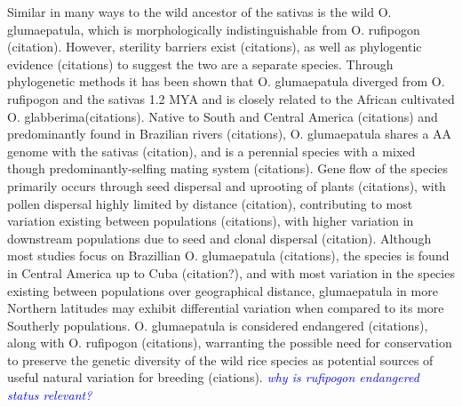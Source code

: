 \documentclass[11pt]{article} %
\newcommand{\jri}[1]{\textcolor{blue}{ \emph{\scriptsize  #1}} } %
\begin{document}
\begin{linenumbers}
Similar in many ways to the wild ancestor of the sativas is the wild O. glumaepatula, which is morphologically indistinguishable from O. rufipogon (citation). However, sterility barriers exist (citations), as well as phylogentic evidence (citations) to suggest the two are a separate species.  Through phylogenetic methods it has been shown that O. glumaepatula diverged from O. rufipogon and the sativas 1.2 MYA and is closely related to the African cultivated O. glabberima(citations). Native to South and Central America (citations) and predominantly found in Brazilian rivers (citations),  O. glumaepatula shares a AA genome with the sativas (citation), and is a perennial species with a mixed though predominantly-selfing mating system (citations).  Gene flow of the species primarily occurs through seed dispersal and uprooting of plants (citations), with pollen dispersal highly limited by distance (citation), contributing to most variation existing between populations (citations), with higher variation in downstream populations due to seed and clonal dispersal (citation). Although most studies focus on Brazillian O. glumaepatula (citations), the species is found in Central America up to Cuba (citation?), and with most variation in the species existing between populations over geographical distance, glumaepatula in more Northern latitudes may exhibit differential variation when compared to its more Southerly populations. O. glumaepatula is considered endangered (citations), along with O. rufipogon (citations), warranting the possible need for conservation to preserve the genetic diversity of the wild rice species as potential sources of useful natural variation for breeding (ciations).  \jri{why is rufipogon endangered status relevant?}


\end{linenumbers}
\end{document}
